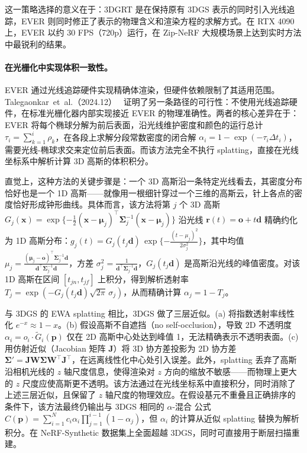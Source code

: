 这一策略选择的意义在于：3DGRT 是在保持原有 3DGS 表示的同时引入光线追踪，EVER 则同时修正了表示的物理含义和渲染方程的求解方式。在 RTX 4090 上，EVER 以约 30 FPS（720p）运行，在 Zip-NeRF 大规模场景上达到实时方法中最锐利的结果。

\paragraph{在光栅化中实现体积一致性。}

EVER 通过光线追踪硬件实现精确体渲染，但硬件依赖限制了其适用范围。Talegaonkar~et~al.（2024.12）~\cite{2412_03378} 证明了另一条路径的可行性：不使用光线追踪硬件，在标准光栅化器内部实现接近 EVER 的物理准确性。两者的核心差异在于：EVER 将每个椭球分解为前后表面，沿光线维护密度和颜色的运行总计 $\tau_i = \sum_{k=1}^{i} \rho_k$，在各段上求解分段常数密度的闭合解 $\alpha_i = 1 - \exp(-\tau_i \Delta t_i)$，需要光线-椭球求交来定位前后表面。而该方法完全不执行 splatting，直接在光线坐标系中解析计算 3D 高斯的体积积分。

直觉上，这种方法的关键步骤是：一个 3D 高斯沿一条特定光线看去，其密度分布恰好也是一个 1D 高斯——就像用一根细针穿过一个三维的高斯云，针上各点的密度恰好形成钟形曲线。具体而言，该方法将第 $j$ 个 3D 高斯 $G_j(\mathbf{x}) = \exp\{-\frac{1}{2}(\mathbf{x}-\boldsymbol{\mu}_j)^\top \boldsymbol{\Sigma}_j^{-1}(\mathbf{x}-\boldsymbol{\mu}_j)\}$ 沿光线 $\mathbf{r}(t) = \mathbf{o} + t\mathbf{d}$ 精确约化为 1D 高斯分布：$g_j(t) = G_j(t_j\mathbf{d})\,\exp\{-\frac{(t-\mu_j)^2}{2\sigma_j^2}\}$，其中均值 $\mu_j = \frac{(\boldsymbol{\mu}_j - \mathbf{o})^\top \boldsymbol{\Sigma}_j^{-1}\mathbf{d}}{\mathbf{d}^\top \boldsymbol{\Sigma}_j^{-1}\mathbf{d}}$，方差 $\sigma_j^2 = \frac{1}{\mathbf{d}^\top \boldsymbol{\Sigma}_j^{-1}\mathbf{d}}$，$G_j(t_j\mathbf{d})$ 是高斯沿光线的峰值密度。对该 1D 高斯在区间 $[t_{jn}, t_{jf}]$ 上积分，得到解析透射率 $T_j = \exp(-G_j(t_j\mathbf{d})\sqrt{2\pi}\,\sigma_j)$，从而精确计算 $\alpha_j = 1 - T_j$。

与 3DGS 的 EWA splatting 相比，3DGS 做了三层近似。(a) 将指数透射率线性化 $e^{-x} \approx 1-x$。(b) 假设高斯不自遮挡（no self-occlusion），导致 2D 不透明度 $\alpha_i = o_i \cdot \tilde{G}_i(\mathbf{p})$ 仅在 2D 高斯中心处达到峰值 1，无法精确表示不透明表面。(c) 用仿射近似（Jacobian 矩阵 $\mathbf{J}$）将 3D 协方差投影为 2D 协方差 $\boldsymbol{\Sigma}' = \mathbf{J}\mathbf{W}\boldsymbol{\Sigma}\mathbf{W}^\top\mathbf{J}^\top$，在远离线性化中心处引入误差。此外，splatting 丢弃了高斯沿相机光线的 $z$ 轴尺度信息，使得渲染对 $z$ 方向的缩放不敏感——而物理上更大的 $z$ 尺度应使高斯更不透明。该方法通过在光线坐标系中直接积分，同时消除了上述三层近似，且保留了 $z$ 轴尺度的物理效应。在假设基元不重叠且正确排序的条件下，该方法最终仍输出与 3DGS 相同的 $\alpha$-混合 公式 $C(\mathbf{p}) = \sum_{i=1}^{N} c_i \alpha_i \prod_{j=1}^{i-1}(1-\alpha_j)$，但 $\alpha_i$ 的计算从近似 splatting 替换为解析积分。在 NeRF-Synthetic 数据集上全面超越 3DGS，同时可直接用于断层扫描重建。

